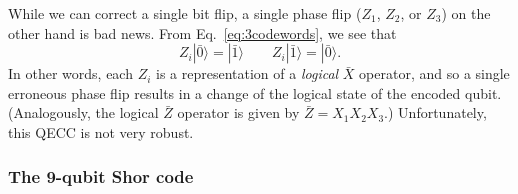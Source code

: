 \documentclass[a4paper,11pt]{article}
\newcommand{\Eq}[1]{Eq.~\eqref{#1}}
\newcommand{\ket}[1]{|#1\rangle}
\begin{document}
While we can correct a single bit flip, a single phase flip ($Z_1$, $Z_2$, or $Z_3$) on the other hand is bad news.
From \Eq{eq:3codewords}, we see that
\begin{equation}
Z_i \ket{\bar{0}} = \ket{\bar{1}} \qquad Z_i \ket{\bar{1}} = \ket{\bar{0}}.
\end{equation}
In other words, each $Z_i$ is a representation of a \emph{logical} $\bar{X}$ operator, and so a single erroneous phase flip results in a change of the logical state of the encoded qubit.
(Analogously, the logical $\bar{Z}$ operator is given by $\bar{Z} = X_1 X_2 X_3$.)
Unfortunately, this QECC is not very robust.


\subsubsection{The 9-qubit Shor code}
\end{document}
